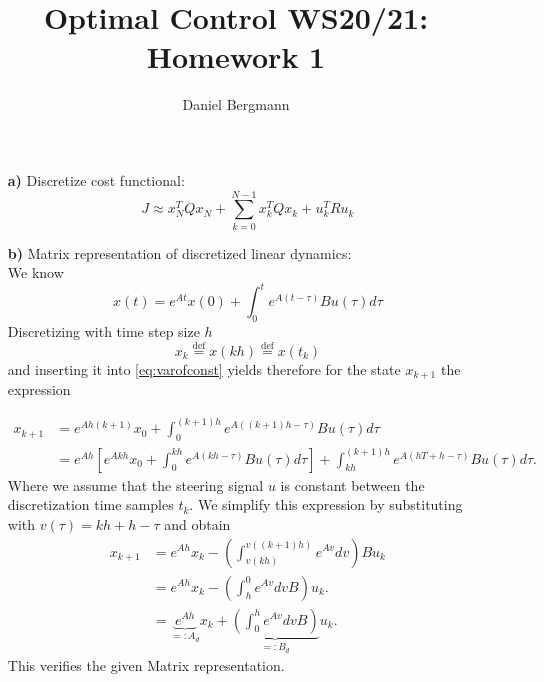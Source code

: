 \documentclass[]{article}
\title{Optimal Control WS20/21: Homework 1}
\author{Daniel Bergmann}
\newcommand{\trp}{^T}
\newcommand{\xnull}{x_0}
\newcommand{\xN}{x_N}
\newcommand{\xk}{x_k}
\newcommand{\uk}{u_k}
\newcommand{\Ad}{A_d}
\newcommand{\Bd}{B_d}
\newcommand{\xkplus}{x_{k+1}}
\newcommand{\tk}{t_{k}}
\begin{document}
\maketitle


\begin{enumerate}
	\item[\bf a)] Discretize cost functional:\\
	 	\begin{equation}
			 J \approx  \xN\trp Q \xN + \sum_{k = 0}^{N-1} \xk \trp Q \xk + \uk\trp R \uk
	 	\end{equation}
		
	\item[\bf b)] Matrix representation of discretized linear dynamics:\\
	
	We know
	\begin{equation}
		x(t) = e^{At} x(0) + \int_{0}^{t} e^{A(t-\tau)} B u(\tau) d\tau \label{eq:varofconst}
	\end{equation}
		Discretizing  with time step size $ h $ \[ \xk \overset{\mathrm{def}}{=} x(kh) \overset{\mathrm{def}}{=} x(t_k) \] and inserting it into  \eqref{eq:varofconst} yields therefore for the state $ \xkplus $ the expression
		
		\begin{align}
			\xkplus &= e^{Ah(k+1)} \xnull + \int_{0}^{(k+1)h} e^{A((k+1)h-\tau)} Bu(\tau) d\tau\\
					&= e^{Ah}\left[ e^{Akh}\xnull + \int_{0}^{kh} e^{A(kh-\tau)}Bu(\tau) d\tau\right] + \int_{kh}^{(k+1)h} e^{A(hT+h-\tau)}Bu(\tau) d\tau.
		\end{align}
		Where we assume that the steering signal $ u $ is constant between the discretization time samples $ \tk. $
		We simplify this expression  by substituting with $ v(\tau) = kh + h - \tau $ and obtain
		\begin{align}
			\xkplus &= e^{Ah}\xk - \left( \int_{v(kh)}^{v((k+1)h)} e^{Av} dv \right) B\uk\\
			&= e^{Ah}\xk - \left(\int_{h}^{0} e^{Av} dv B \right) \uk.\\
					&= \underbrace{e^{Ah}}_{=:\Ad}\xk + \underbrace{\left(\int_{0}^{h} e^{Av} dv B \right)}_{=:\Bd}   \uk. \label{eq:exactdiscr}
		\end{align}
		This verifies the given Matrix representation.


\end{enumerate}
\end{document}
